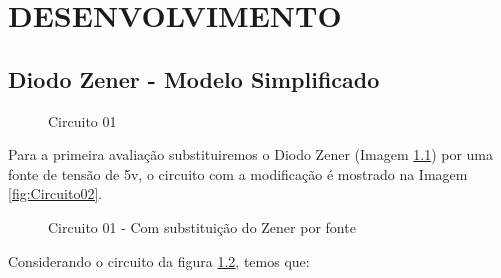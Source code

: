 \chapter{DESENVOLVIMENTO}

\section{Diodo Zener - Modelo Simplificado}

\begin{figure}[H]
    \centering
    \caption{Circuito 01}
    \vspace{-0.3cm}
    \label{fig:Circuito01}
\end{figure}

Para a primeira avaliação substituiremos o Diodo Zener (Imagem \ref{fig:Circuito01}) por uma fonte de tensão de 5v, o circuito com a modificação é mostrado na Imagem \ref{fig:Circuito02}.

\begin{figure}[H]
    \centering
    \caption{Circuito 01 - Com substituição do Zener por fonte}
    \vspace{-0.3cm}
    \label{fig:Circuito01ComSubstituicao}
\end{figure}

Considerando o circuito da figura \ref{fig:Circuito01ComSubstituicao}, temos que:

